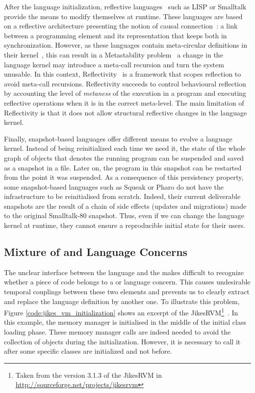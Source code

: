 
After the language initialization, reflective languages~\cite{Smit84a} such as LISP or Smalltalk provide the means to modify themselves at runtime. These languages are based on a reflective architecture presenting the notion of causal connection~\cite{Maes87a}: a link between a programming element and its representation that keeps both in synchronization. However, as these languages contain meta-circular definitions in their kernel~\cite{Chib96a}, this can result in a Metastability problem~\cite{Kicz91a} \ie a change in the language kernel may introduce a meta-call recursion and turn the system unusable. In this context, Reflectivity~\cite{Denk08b} is a framework that scopes reflection to avoid meta-call recursions.  Reflectivity succeeds to control behavioural reflection by accounting the level of \emph{metaness} of the execution in a program and executing reflective operations when it is in the correct meta-level. The main limitation of Reflectivity is that it does not allow structural reflective changes in the language kernel.

Finally, snapshot-based languages offer different means to evolve a language kernel. Instead of being reinitialized each time we need it, the state of the whole graph of objects that denotes the running program can be suspended and saved as a snapshot in a file. Later on, the program in this snapshot can be restarted from the point it was suspended. As a consequence of this persistency property, some snapshot-based languages such as Squeak or Pharo  do not have the infrastructure to be reinitialised from scratch. Indeed, their current deliverable snapshots are the result of a chain of side effects (updates and migrations) made to the original Smalltalk-80 snapshot. Thus, even if we can change the language kernel at runtime, they cannot ensure a reproducible initial state for their users.

\subsection{Mixture of \VM and Language Concerns}

The unclear interface between the language and the \VM makes difficult to recognize whether a piece of code belongs to a \VM or language concern. This causes undesirable temporal couplings between these two elements and prevents us to clearly extract and replace the language definition by another one.
To illustrate this problem, Figure \ref{code:jikes_vm_initialization} shows an excerpt of the JikesRVM\footnote{Taken from the version 3.1.3 of the JikesRVM in \url{http://sourceforge.net/projects/jikesrvm}}~\cite{Alpe00a}. In this example, the memory manager is initialised in the middle of the initial class loading phase. These memory manager calls are indeed needed to avoid the collection of objects during the initialization. However, it is necessary to call it after some specific classes are initialized and not before.


